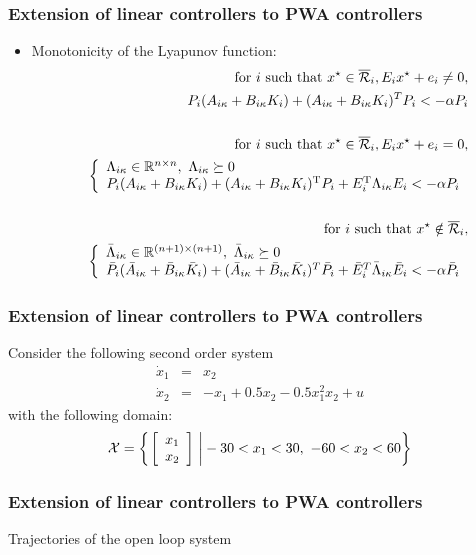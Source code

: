 \documentclass{beamer}
\newcommand{\TR}{\text{T}}
\newcommand{\RR}{{\cal R}}
\newcommand{\RE}{{\mathbb R}}
\newcommand{\beq}{\begin{equation*}}
\newcommand{\eeq}{\end{equation*}}
\newcommand{\bmat}{\left[\begin{array}}
\newcommand{\emat}{\end{array}\right]}
\begin{document}
  \frame
  {
    \frametitle{Extension of linear controllers to PWA controllers}
\begin{itemize}
\item Monotonicity of the Lyapunov function:
\begin{eqnarray*}
&&\text{ for } i\text{ such that }x^\star\in\overline\RR_i, E_ix^\star+e_i\neq 0,\nonumber\\
&&P_i(A_{i\kappa}+B_{i\kappa}K_i)+(A_{i\kappa}+B_{i\kappa}K_i)^T P_i<-\alpha P_i\\\nonumber\\
&&\text{ for } i\text{ such that }x^\star\in\overline\RR_i, E_ix^\star+e_i=0,\nonumber\\
&&\left\{\begin{array}{l}\Lambda_{i\kappa}\in\RE^{n\times n},\ \Lambda_{i\kappa}\succeq 0\\ 
 P_i(A_{i\kappa}+B_{i\kappa}K_i)+(A_{i\kappa}+B_{i\kappa}K_i)^\TR P_i+E_i^\TR\Lambda_{i\kappa}E_i<-\alpha P_i\end{array}\right.\\\nonumber\\
&&\text{ for } i\text{ such that }x^\star\notin\overline\RR_i,\nonumber\\
&&\left\{\begin{array}{l} \bar \Lambda_{i\kappa}\in\RE^{(n+1)\times (n+1)},\ \bar \Lambda_{i\kappa}\succeq 0\\
 \bar P_i(\bar A_{i\kappa}+\bar B_{i\kappa}\bar K_i)+(\bar A_{i\kappa}+\bar B_{i\kappa}\bar K_i)^T\bar P_i+\bar{E}_i^T\bar\Lambda_{i\kappa}\bar{E}_i<-\alpha\bar P_i\end{array}\right.
\end{eqnarray*}
\end{itemize}
  }

  \frame
  {
    \frametitle{Extension of linear controllers to PWA controllers}
Consider the following second order system
\begin{eqnarray*}
\dot x_1&=&x_2\\
\dot x_2&=&-x_1+0.5x_2-0.5x_1^2x_2+u
\end{eqnarray*}
with the following domain:
\beq
{\cal X}=\left\{\left.\bmat{c}x_1\\x_2\emat\ \right| -30<x_1<30,\ -60<x_2<60 \right\}
\eeq
}

  \frame
  {
    \frametitle{Extension of linear controllers to PWA controllers}
\centerline{\resizebox{9cm}{!}{}}
\centerline{Trajectories of the open loop system}  
}
\end{document}
